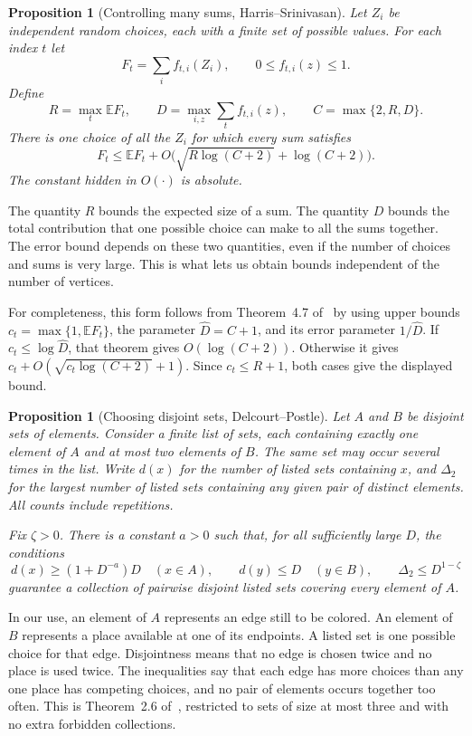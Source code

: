 \documentclass[11pt]{article}
\newtheorem{proposition}[theorem]{Proposition}
\theoremstyle{definition}\newtheorem{algorithm}{Algorithm}[section]
\numberwithin{equation}{section}
\theoremstyle{remark}\newtheorem*{remark}{Remark}
\newcommand{\E}{\mathbb E}
\begin{document}
\begin{proposition}[Controlling many sums, Harris--Srinivasan]\label{prop:HS}
Let $Z_i$ be independent random choices, each with a finite set of possible
values. For each index $t$ let
\[
 F_t=\sum_i f_{t,i}(Z_i),\qquad 0\le f_{t,i}(z)\le1.
\]
Define
\[
 R=\max_t\E F_t,\qquad
 D=\max_{i,z}\sum_t f_{t,i}(z),\qquad C=\max\{2,R,D\}.
\]
There is one choice of all the $Z_i$ for which every sum satisfies
\[
 F_t\le\E F_t+
 O\bigl(\sqrt{R\log(C+2)}+\log(C+2)\bigr).
\]
The constant hidden in $O(\cdot)$ is absolute.
\end{proposition}

The quantity $R$ bounds the expected size of a sum. The quantity $D$
bounds the total contribution that one possible choice can make to all
the sums together. The error bound depends on these two quantities,
even if the number of choices and sums is very large. This is what lets
us obtain bounds independent of the number of vertices.

For completeness, this form follows from Theorem~4.7 of~\cite{HS} by
using upper bounds $c_t=\max\{1,\E F_t\}$, the parameter
$\widehat D=C+1$, and its error parameter $1/\widehat D$.
If $c_t\le\log\widehat D$, that theorem gives $O(\log(C+2))$.
Otherwise it gives
$c_t+O(\sqrt{c_t\log(C+2)}+1)$. Since $c_t\le R+1$, both cases
give the displayed bound.

\begin{proposition}[Choosing disjoint sets, Delcourt--Postle]\label{prop:DP}
Let $A$ and $B$ be disjoint sets of elements. Consider a finite list of
sets, each containing exactly one element of $A$ and at most two elements
of $B$. The same set may occur several times in the list. Write $d(x)$
for the number of listed sets containing $x$, and $\Delta_2$ for the
largest number of listed sets containing any given pair of distinct
elements. All counts include repetitions.

Fix $\zeta>0$. There is a constant $a>0$ such that, for all sufficiently
large $D$, the conditions
\[
 d(x)\ge(1+D^{-a})D\quad(x\in A),\qquad
 d(y)\le D\quad(y\in B),\qquad
 \Delta_2\le D^{1-\zeta}
\]
guarantee a collection of pairwise disjoint listed sets covering every
element of $A$.
\end{proposition}

In our use, an element of $A$ represents an edge still to be colored.
An element of $B$ represents a place available at one of its endpoints.
A listed set is one possible choice for that edge. Disjointness means
that no edge is chosen twice and no place is used twice. The inequalities
say that each edge has more choices than any one place has competing
choices, and no pair of elements occurs together too often. This is
Theorem~2.6 of~\cite{DP}, restricted to sets of size at most three and
with no extra forbidden collections.
\end{document}
